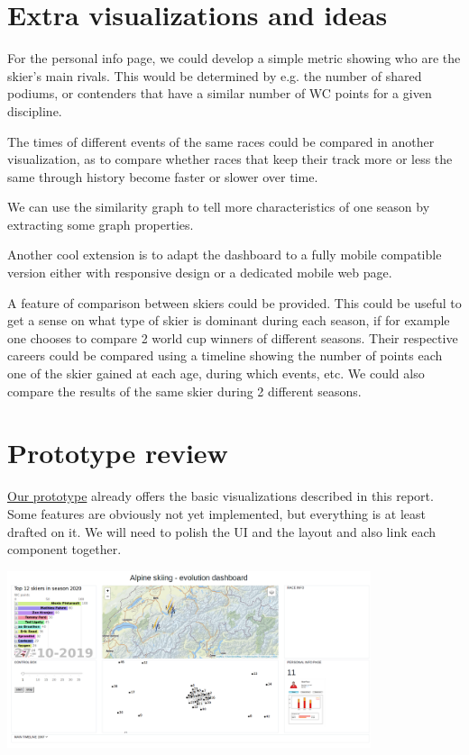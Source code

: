 \documentclass[a4paper,10pt]{article}
\begin{document}
\section{Extra visualizations and ideas}

For the personal info page, we could develop a simple metric showing who are the skier's main rivals.
This would be determined by e.g. the number of shared podiums, or contenders that have a similar number of WC points for a given discipline.

The times of different events of the same races could be compared in another visualization, as to compare whether races that keep their track more or less the same through history become faster or slower over time.

We can use the similarity graph to tell more characteristics of one season by extracting some graph properties.

Another cool extension is to adapt the dashboard to a fully mobile compatible version either with responsive design or a dedicated mobile web page. 

A feature of comparison between skiers could be provided.
This could be useful to get a sense on what type of skier is dominant during each season, if for example one chooses to compare 2 world cup winners of different seasons.
Their respective careers could be compared using a timeline showing the number of points each one of the skier gained at each age, during which events, etc.
We could also compare the results of the same skier during 2 different seasons.

\section{Prototype review}

\href{https://com-480-project-data-viz-le-6.github.io/}{Our prototype} already offers the basic visualizations described in this report.
Some features are obviously not yet implemented, but everything is at least drafted on it.
We will need to polish the UI and the layout and also link each component together.

\begin{center}
    \includegraphics[width=0.8\textwidth]{prototype.png}
\end{center}
\end{document}

